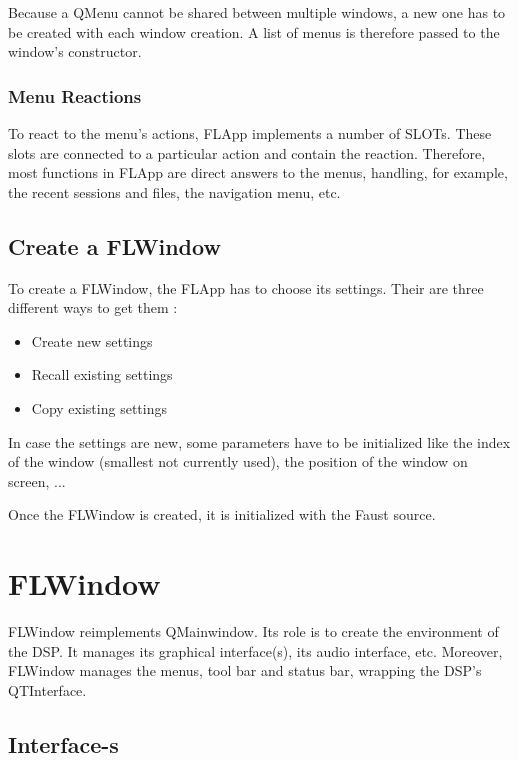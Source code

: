 \documentclass[a4paper]{article}
\begin{document}
Because a QMenu cannot be shared between multiple windows, a new one has to be created with each window creation. A list of menus is therefore passed to the window's constructor.

\subsubsection{Menu Reactions}

To react to the menu's actions, FLApp implements a number of SLOTs. These slots are connected to a particular action and contain the reaction. Therefore, most functions in FLApp are direct answers to the menus, handling, for example, the recent sessions and files, the navigation menu, etc.

\subsection{Create a FLWindow}

To create a FLWindow, the FLApp has to choose its settings. Their are three different ways to get them  :

\begin{itemize}
\item Create new settings
\item Recall existing settings
\item Copy existing settings
\end{itemize}

In case the settings are new, some parameters have to be initialized like the index of the window (smallest not currently used), the position of the window on screen, ...

Once the FLWindow is created, it is initialized with the Faust source.

\section{FLWindow}

FLWindow reimplements QMainwindow. Its role is to create the environment of the DSP. It manages its graphical interface(s), its audio interface, etc. Moreover, FLWindow manages the menus, tool bar and status bar, wrapping the DSP's QTInterface. 

\subsection{Interface-s}
\end{document}
